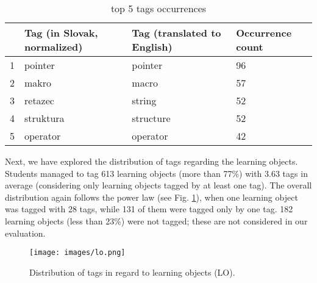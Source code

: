 \documentclass{IEEEtran}     %
\begin{document}
\begin{table}[h]           %
\centering
\caption{top 5 tags occurrences}  %
\begin{tabular}{|c|l|l|l|}                      %
\hline                                                     %
\textbf{} & \multicolumn{1}{p{2.3cm}|}{\textbf{Tag (in Slovak, normalized)}} & \multicolumn{1}{p{2.3cm}|}{\textbf{Tag (translated to English)}} & \multicolumn{1}{p{2.3cm}|}{\textbf{Occurrence count}} \\ \hline
1         & pointer                                                   & pointer                                                   & 96                                             \\ \hline
2         & makro                                                     & macro                                                     & 57                                             \\ \hline
3         & retazec                                                   & string                                                    & 52                                             \\ \hline
4         & struktura                                                 & structure                                                 & 52                                             \\ \hline
5         & operator                                                  & operator                                                  & 42                                             \\ \hline
\end{tabular}
\end{table}

Next, we have explored the distribution of tags regarding
the learning objects. Students managed to tag 613 learning
objects (more than 77\%) with 3.63 tags in average
(considering only learning objects tagged by at least one tag).
The overall distribution again follows the power law (see
Fig. \ref{lo}), when one learning object was tagged with 28 tags,
while 131 of them were tagged only by one tag. 182 learning
objects (less than 23\%) were not tagged; these are not
considered in our evaluation.

\begin{figure}[h]
\centering
\texttt{[image: images/lo.png]}
\caption{Distribution of tags in regard to learning objects (LO).}
\label{lo}
\end{figure}
\end{document}
